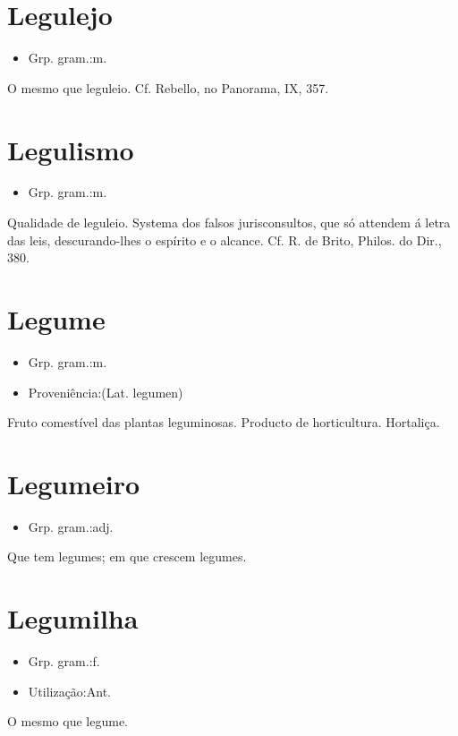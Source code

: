 \section{Legulejo}
\begin{itemize}
\item {Grp. gram.:m.}
\end{itemize}
O mesmo que \textunderscore leguleio\textunderscore . Cf. Rebello, no \textunderscore Panorama\textunderscore , IX, 357.
\section{Legulismo}
\begin{itemize}
\item {Grp. gram.:m.}
\end{itemize}
Qualidade de leguleio.
Systema dos falsos jurisconsultos, que só attendem á letra das leis, descurando-lhes o espírito e o alcance. Cf. R. de Brito, \textunderscore Philos. do Dir.\textunderscore , 380.
\section{Legume}
\begin{itemize}
\item {Grp. gram.:m.}
\end{itemize}
\begin{itemize}
\item {Proveniência:(Lat. \textunderscore legumen\textunderscore )}
\end{itemize}
Fruto comestível das plantas leguminosas.
Producto de horticultura.
Hortaliça.
\section{Legumeiro}
\begin{itemize}
\item {Grp. gram.:adj.}
\end{itemize}
Que tem legumes; em que crescem legumes.
\section{Legumilha}
\begin{itemize}
\item {Grp. gram.:f.}
\end{itemize}
\begin{itemize}
\item {Utilização:Ant.}
\end{itemize}
O mesmo que \textunderscore legume\textunderscore .
